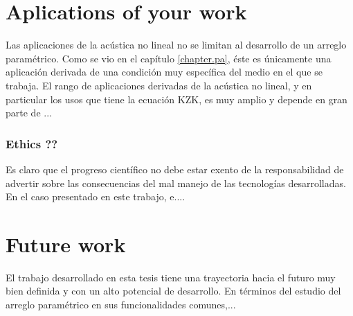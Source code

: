 \section{Aplications of your work}
Las aplicaciones de la acústica no lineal no se limitan al desarrollo de un arreglo paramétrico. Como se vio en el capítulo \ref{chapter.pa}, éste es únicamente una aplicación derivada de una condición muy específica del medio en el que se trabaja. El rango de aplicaciones derivadas de la acústica no lineal, y en particular los usos que tiene la ecuación KZK, es muy amplio y depende en gran parte de ...
\subsubsection{Ethics ?? }
Es claro que el progreso científico no debe estar exento de la responsabilidad de advertir sobre las consecuencias del mal manejo de las tecnologías desarrolladas. En el caso presentado en este trabajo, e....
\section{Future work}
El trabajo desarrollado en esta tesis tiene una trayectoria hacia el futuro muy bien definida y con un alto potencial de desarrollo. En términos del estudio del arreglo paramétrico en sus funcionalidades comunes,...